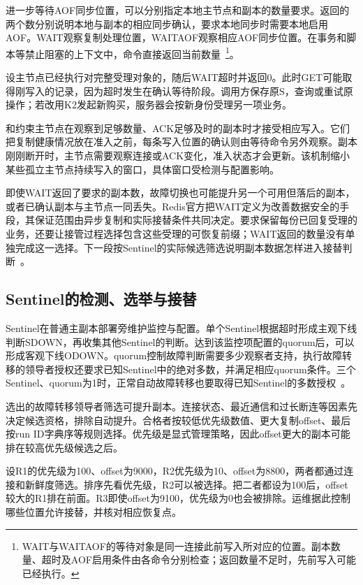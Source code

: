 进一步等待AOF同步位置，可以分别指定本地主节点和副本的数量要求。返回的两个数分别说明本地与副本的相应同步确认，要求本地同步时需要本地启用AOF。WAIT观察复制处理位置，WAITAOF观察相应AOF同步位置。在事务和脚本等禁止阻塞的上下文中，命令直接返回当前数量~\cite{redis8102-wait}\footnote{WAIT与WAITAOF的等待对象是同一连接此前写入所对应的位置。副本数量、超时及AOF启用条件由各命令分别检查；返回数量不足时，先前写入可能已经执行。}。


设主节点已经执行对完整受理对象的，随后WAIT超时并返回0。此时GET可能取得刚写入的记录，因为超时发生在确认等待阶段。调用方保存原S，查询或重试原操作；若改用K2发起新购买，服务器会按新身份受理另一项业务。

和约束主节点在观察到足够数量、ACK足够及时的副本时才接受相应写入。它们把复制健康情况放在准入之前，每条写入位置的确认则由等待命令另外观察。副本刚刚断开时，主节点需要观察连接或ACK变化，准入状态才会更新。该机制缩小某些孤立主节点持续写入的窗口，具体窗口受检测与配置影响。

即使WAIT返回了要求的副本数，故障切换也可能提升另一个可用但落后的副本，或者已确认副本与主节点一同丢失。Redis官方把WAIT定义为改善数据安全的手段，其保证范围由异步复制和实际接替条件共同决定。要求保留每份已回复受理的业务，还要让接管过程选择包含这些受理的可恢复前缀；WAIT返回的数量没有单独完成这一选择。下一段按Sentinel的实际候选筛选说明副本数据怎样进入接替判断~\cite{redis8102-wait}。

\subsection{Sentinel的检测、选举与接替}

Sentinel在普通主副本部署旁维护监控与配置。单个Sentinel根据超时形成主观下线判断SDOWN，再收集其他Sentinel的判断。达到该监控项配置的quorum后，可以形成客观下线ODOWN。quorum控制故障判断需要多少观察者支持，执行故障转移的领导者授权还要求已知Sentinel中的绝对多数，并满足相应quorum条件。三个Sentinel、quorum为1时，正常自动故障转移也要取得已知Sentinel的多数授权~\cite{redis8102-sentinel}。

选出的故障转移领导者筛选可提升副本。连接状态、最近通信和过长断连等因素先决定候选资格，排除自动提升。合格者按较低优先级数值、更大复制offset、最后按run ID字典序等规则选择。优先级是显式管理策略，因此offset更大的副本可能排在较高优先级候选之后。

设R1的优先级为100、offset为9000，R2优先级为10、offset为8800，两者都通过连接和新鲜度筛选。排序先看优先级，R2可以被选择。把二者都设为100后，offset较大的R1排在前面。R3即使offset为9100，优先级为0也会被排除。运维据此控制哪些位置允许接替，并核对相应恢复点。

